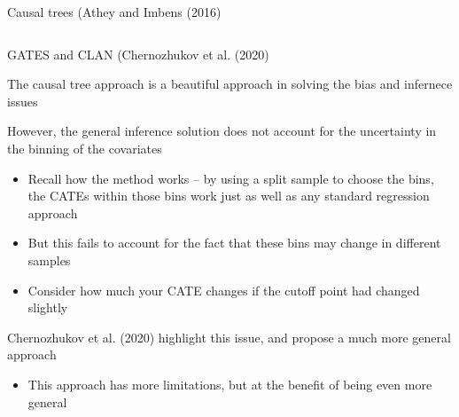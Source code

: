 \documentclass[notes,11pt, aspectratio=169]{beamer}
\newenvironment{wideitemize}{\itemize\addtolength{\itemsep}{10pt}}{\enditemize}
\begin{document}
\begin{frame}{Causal trees (Athey and Imbens (2016)}
\begin{columns}[onlytextwidth, T]
\begin{column}{.5\textwidth}
      \end{column}%
    \end{columns}
\end{frame}

\begin{frame}{GATES and CLAN (Chernozhukov et al. (2020)}
  \begin{wideitemize}
  \item The causal tree approach is a beautiful approach in solving
    the bias and infernece issues
  \item However, the general inference solution does not account for
    the uncertainty in the binning of the covariates
    \begin{itemize}
    \item Recall how the method works -- by using a split sample to
      choose the bins, the CATEs within those bins work just as well
      as any standard regression approach
    \item But this fails to account for the fact that these bins may
      change in different samples
    \item Consider how much your CATE changes if the cutoff point had
      changed slightly
    \end{itemize}
  \item Chernozhukov et al. (2020) highlight this issue, and propose a
    much more general approach
    \begin{itemize}
    \item This approach has more limitations, but at the benefit of
      being even more general
    \end{itemize}
  \end{wideitemize}
\end{frame}
\end{document}
